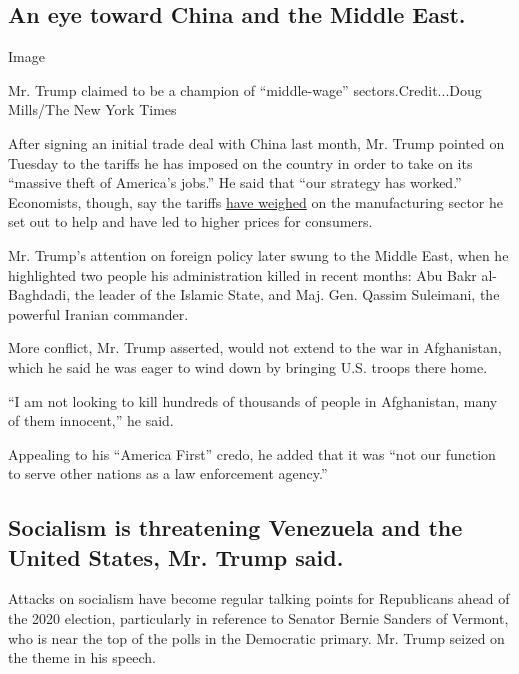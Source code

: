 \hypertarget{an-eye-toward-china-and-the-middle-east}{%
\subsection{An eye toward China and the Middle
East.}\label{an-eye-toward-china-and-the-middle-east}}

Image

Mr. Trump claimed to be a champion of ``middle-wage''
sectors.Credit...Doug Mills/The New York Times

After signing an initial trade deal with China last month, Mr. Trump
pointed on Tuesday to the tariffs he has imposed on the country in order
to take on its ``massive theft of America's jobs.'' He said that ``our
strategy has worked.'' Economists, though, say the tariffs
\href{https://www.nytimes3xbfgragh.onion/live/2020/fact-check-state-of-the-union-02-04\#i-also-promised-citizens-i-would-impose-tariffs-to-confront-chinas-massive-theft-of-americas-jobs-our-strategy-has-worked}{have
weighed} on the manufacturing sector he set out to help and have led to
higher prices for consumers.

Mr. Trump's attention on foreign policy later swung to the Middle East,
when he highlighted two people his administration killed in recent
months: Abu Bakr al-Baghdadi, the leader of the Islamic State, and Maj.
Gen. Qassim Suleimani, the powerful Iranian commander.

More conflict, Mr. Trump asserted, would not extend to the war in
Afghanistan, which he said he was eager to wind down by bringing U.S.
troops there home.

``I am not looking to kill hundreds of thousands of people in
Afghanistan, many of them innocent,'' he said.

Appealing to his ``America First'' credo, he added that it was ``not our
function to serve other nations as a law enforcement agency.''

\hypertarget{socialism-is-threatening-venezuela-and-the-united-states-mr-trump-said}{%
\subsection{Socialism is threatening Venezuela and the United States,
Mr. Trump
said.}\label{socialism-is-threatening-venezuela-and-the-united-states-mr-trump-said}}

Attacks on socialism have become regular talking points for Republicans
ahead of the 2020 election, particularly in reference to Senator Bernie
Sanders of Vermont, who is near the top of the polls in the Democratic
primary. Mr. Trump seized on the theme in his speech.

